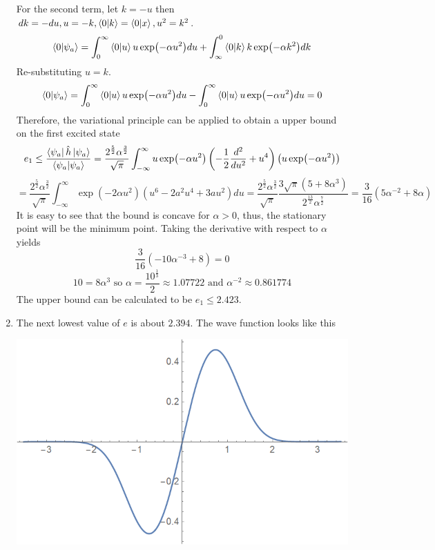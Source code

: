 \begin{sol}
\begin{enumerate}[label=\textbf{(\alph*)}]
For the second term, let $k=-u$ then $dk=-du,u=-k,\braket{0}{k}=\braket{0}{x}, u^2=k^2$.
$$\braket{0}{\psi_a}=\int_0^\infty\braket{0}{u}u\exp(-\alpha u^2)du+\int_{\infty}^0\braket{0}{k}k\exp(-\alpha k^2)dk$$ 
Re-substituting $u=k$.
$$\braket{0}{\psi_a}=\int_0^\infty\braket{0}{u}u\exp(-\alpha u^2)du-\int_{0}^\infty\braket{0}{u}u\exp(-\alpha u^2)du=0$$
Therefore, the variational principle can be applied to obtain a upper bound on the first excited state
$$e_1\leq\frac{\bra{\psi_a}\hat h\ket{\psi_a}}{\braket{\psi_a}{\psi_a}}=\frac{2^\frac{5}{2}\alpha^\frac{3}{2}}{\sqrt\pi}\int_{-\infty}^\infty u\exp(-\alpha u^2)\left(-\frac{1}{2}\frac{d^2}{du^2}+u^4\right)\left(u\exp(-\alpha u^2)\right)$$  
$$=\frac{2^\frac{5}{2}\alpha^\frac{3}{2}}{\sqrt\pi}\int_{-\infty}^\infty \exp(-2\alpha u^2)\left(u^6-2a^2u^4+3au^2\right)du=\frac{2^\frac{5}{2}\alpha^\frac{3}{2}}{\sqrt{\pi}}\frac{3\sqrt{\pi}(5+8\alpha^3)}{2^\frac{13}{2}\alpha^\frac{7}{2}}=\frac{3}{16}(5\alpha^{-2}+8\alpha)$$ 
It is easy to see that the bound is concave for $\alpha>0$, thus, the stationary point will be the minimum point. Taking the derivative with respect to $\alpha$ yields
$$\frac{3}{16}(-10\alpha^{-3}+8)=0$$
$$10=8\alpha^3\text{ so }\alpha=\frac{10^{\frac{1}{3}}}{2}\approx 1.07722\text{ and }\alpha^{-2}\approx 0.861774$$   
The upper bound can be calculated to be $e_1\leq 2.423$.
\newpage
\item
The next lowest value of $e$ is about $2.394$. The wave function looks like this\\
\begin{center}
\includegraphics[scale=0.4]{P02/HO1.png}
\end{center}
\end{enumerate}
\end{sol}